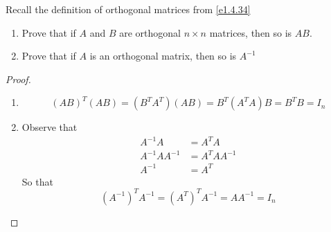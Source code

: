 \begin{exercise} \label{e1.4.35}
    Recall the definition of orthogonal matrices from \ref{e1.4.34}
    
    \begin{enumerate}
        \item Prove that if \( A \) and \( B \) are orthogonal \( n \times n \) matrices, then so is \( AB \).
        
        \item Prove that if \( A \) is an orthogonal matrix, then so is \( A^{-1} \)
    \end{enumerate}
    
    \begin{proof}
        \begin{enumerate}
            \item \[ (AB)^T(AB) = (B^TA^T)(AB) = B^T(A^TA)B = B^TB = I_n \]
            
            \item Observe that
            \begin{align*}
                A^{-1}A &= A^TA \\
                A^{-1}AA^{-1} &= A^TAA^{-1} \\
                A^{-1} &= A^T
            \end{align*}
            So that
            \[ \left( A^{-1} \right)^T A^{-1} = \left( A^T \right)^T A^{-1} = AA^{-1} = I_n \]
        \end{enumerate}
    \end{proof}
\end{exercise} %

